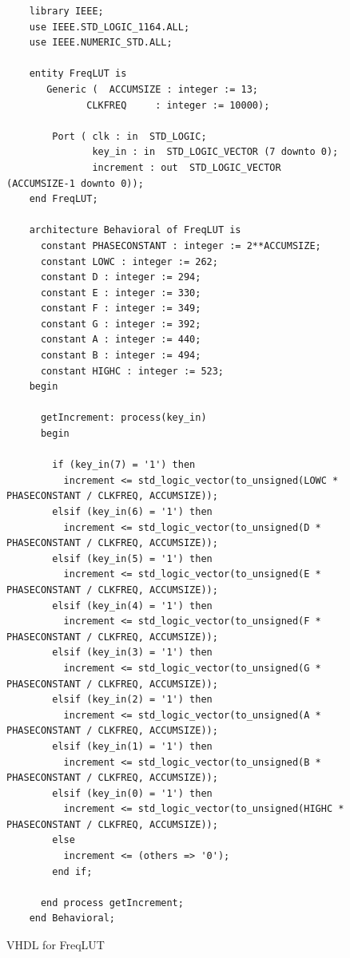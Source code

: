 \documentclass{article}
\begin{document}
	      \begin{figure}[H]
	        \caption{VHDL for FreqLUT}
	        \begin{verbatim}
	library IEEE;
	use IEEE.STD_LOGIC_1164.ALL;
	use IEEE.NUMERIC_STD.ALL;

	entity FreqLUT is
	   Generic (  ACCUMSIZE : integer := 13;
	          CLKFREQ     : integer := 10000);
	          
	    Port ( clk : in  STD_LOGIC;
	           key_in : in  STD_LOGIC_VECTOR (7 downto 0);
	           increment : out  STD_LOGIC_VECTOR (ACCUMSIZE-1 downto 0));
	end FreqLUT;

	architecture Behavioral of FreqLUT is
	  constant PHASECONSTANT : integer := 2**ACCUMSIZE;
	  constant LOWC : integer := 262;
	  constant D : integer := 294;
	  constant E : integer := 330;
	  constant F : integer := 349;
	  constant G : integer := 392;
	  constant A : integer := 440;
	  constant B : integer := 494;
	  constant HIGHC : integer := 523;
	begin

	  getIncrement: process(key_in)
	  begin
	  
	    if (key_in(7) = '1') then
	      increment <= std_logic_vector(to_unsigned(LOWC * PHASECONSTANT / CLKFREQ, ACCUMSIZE));
	    elsif (key_in(6) = '1') then
	      increment <= std_logic_vector(to_unsigned(D * PHASECONSTANT / CLKFREQ, ACCUMSIZE));
	    elsif (key_in(5) = '1') then
	      increment <= std_logic_vector(to_unsigned(E * PHASECONSTANT / CLKFREQ, ACCUMSIZE));
	    elsif (key_in(4) = '1') then
	      increment <= std_logic_vector(to_unsigned(F * PHASECONSTANT / CLKFREQ, ACCUMSIZE));
	    elsif (key_in(3) = '1') then
	      increment <= std_logic_vector(to_unsigned(G * PHASECONSTANT / CLKFREQ, ACCUMSIZE));
	    elsif (key_in(2) = '1') then
	      increment <= std_logic_vector(to_unsigned(A * PHASECONSTANT / CLKFREQ, ACCUMSIZE));
	    elsif (key_in(1) = '1') then
	      increment <= std_logic_vector(to_unsigned(B * PHASECONSTANT / CLKFREQ, ACCUMSIZE));
	    elsif (key_in(0) = '1') then
	      increment <= std_logic_vector(to_unsigned(HIGHC * PHASECONSTANT / CLKFREQ, ACCUMSIZE));
	    else 
	      increment <= (others => '0');
	    end if;
	  
	  end process getIncrement;
	end Behavioral;
	        \end{verbatim}
	      \end{figure}
\end{document}
